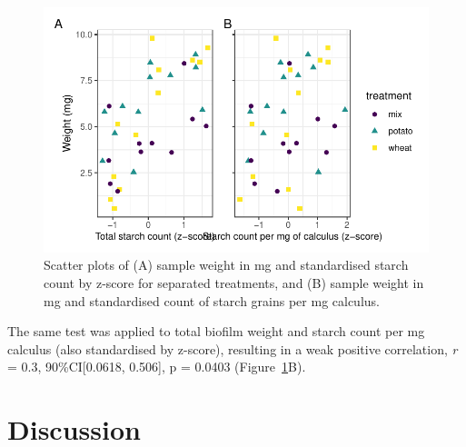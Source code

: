 \documentclass[
  b5paper,
]{book}
\begin{document}
\begin{figure}[H]

{\centering \includegraphics{figures/byoc-starch-fig-cor-plot-1.pdf}

}

\caption{\label{fig-cor-plot}Scatter plots of (A) sample weight in mg
and standardised starch count by z-score for separated treatments, and
(B) sample weight in mg and standardised count of starch grains per mg
calculus.}

\end{figure}

The same test was applied to total biofilm weight and starch count per
mg calculus (also standardised by z-score), resulting in a weak positive
correlation, \emph{r} = 0.3, 90\%CI{[}0.0618, 0.506{]}, p = 0.0403
(Figure~\ref{fig-cor-plot}B).

\hypertarget{discussion-1}{%
\section{Discussion}\label{discussion-1}}
\end{document}

